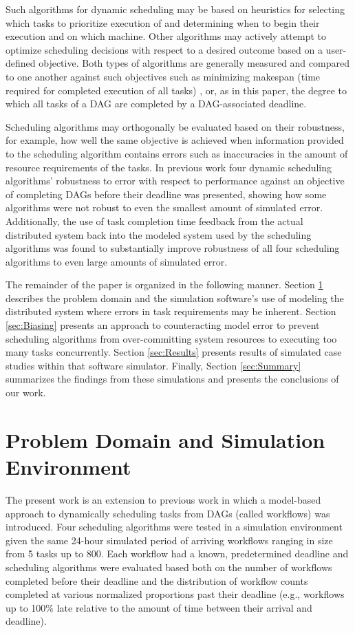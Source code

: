 \documentclass[10pt]{csce}
\begin{document}
Such algorithms for dynamic scheduling may be based on heuristics for selecting
which tasks to prioritize execution of and determining when to begin their
execution and on which machine. Other algorithms may actively attempt to
optimize scheduling decisions with respect to a desired outcome based on a
user-defined objective.  Both types of algorithms are generally measured
and compared to one another against such objectives such as minimizing makespan
(time required for completed execution of all tasks) \cite{stochastic}, or, as
in this paper, the degree to which all tasks of a DAG are completed by a
DAG-associated deadline.

Scheduling algorithms may orthogonally be evaluated based on their robustness,
for example, how well the same objective is achieved when information provided
to the scheduling algorithm contains errors such as inaccuracies in the
amount of resource requirements of the tasks.  In previous work \cite{pdpta18}
four dynamic scheduling algorithms' robustness to error with respect to
performance against an objective of completing DAGs before their deadline was
presented, showing how some algorithms were not robust to even the smallest
amount of simulated error.  Additionally, the use of task completion time
feedback from the actual distributed system back into the modeled system used
by the scheduling algorithms was found to substantially improve robustness of
all four scheduling algorithms to even large amounts of simulated error.

The remainder of the paper is organized in the following manner.  Section
\ref{sec:Framework} describes the problem domain and the simulation software's
use of modeling the distributed system where errors in task requirements may
be inherent.  Section \ref{sec:Biasing} presents an approach to counteracting
model error to prevent scheduling algorithms from over-committing system
resources to executing too many tasks concurrently. Section \ref{sec:Results}
presents results of simulated case studies within that software simulator.
Finally, Section \ref{sec:Summary} summarizes the findings from these
simulations and presents the conclusions of our work.


\section{Problem Domain and Simulation Environment}
\label{sec:Framework}

The present work is an extension to previous work \cite{pdpta18} in which a
model-based approach to dynamically scheduling tasks from DAGs (called
workflows) was introduced.  Four scheduling algorithms were tested in a
simulation environment \cite{soasim} given the same 24-hour simulated period
of arriving workflows ranging in size from 5 tasks up to 800.  Each workflow
had a known, predetermined deadline and scheduling algorithms were evaluated
based both on the number of workflows completed before their deadline and the
distribution of workflow counts completed at various normalized proportions
past their deadline (e.g., workflows up to 100\% late relative to the amount
of time between their arrival and deadline).
\end{document}
